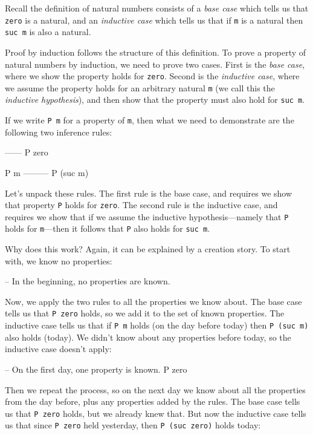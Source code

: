 Recall the definition of natural numbers consists of a \emph{base case}
which tells us that \texttt{zero} is a natural, and an \emph{inductive
case} which tells us that if \texttt{m} is a natural then
\texttt{suc\ m} is also a natural.

Proof by induction follows the structure of this definition. To prove a
property of natural numbers by induction, we need to prove two cases.
First is the \emph{base case}, where we show the property holds for
\texttt{zero}. Second is the \emph{inductive case}, where we assume the
property holds for an arbitrary natural \texttt{m} (we call this the
\emph{inductive hypothesis}), and then show that the property must also
hold for \texttt{suc\ m}.

If we write \texttt{P\ m} for a property of \texttt{m}, then what we
need to demonstrate are the following two inference rules:

\begin{myDisplay}
------
P zero

P m
---------
P (suc m)
\end{myDisplay}

Let's unpack these rules. The first rule is the base case, and requires
we show that property \texttt{P} holds for \texttt{zero}. The second
rule is the inductive case, and requires we show that if we assume the
inductive hypothesis---namely that \texttt{P} holds for
\texttt{m}---then it follows that \texttt{P} also holds for
\texttt{suc\ m}.

Why does this work? Again, it can be explained by a creation story. To
start with, we know no properties:

\begin{myDisplay}
-- In the beginning, no properties are known.
\end{myDisplay}

Now, we apply the two rules to all the properties we know about. The
base case tells us that \texttt{P\ zero} holds, so we add it to the set
of known properties. The inductive case tells us that if \texttt{P\ m}
holds (on the day before today) then \texttt{P\ (suc\ m)} also holds
(today). We didn't know about any properties before today, so the
inductive case doesn't apply:

\begin{myDisplay}
-- On the first day, one property is known.
P zero
\end{myDisplay}

Then we repeat the process, so on the next day we know about all the
properties from the day before, plus any properties added by the rules.
The base case tells us that \texttt{P\ zero} holds, but we already knew
that. But now the inductive case tells us that since \texttt{P\ zero}
held yesterday, then \texttt{P\ (suc\ zero)} holds today:

